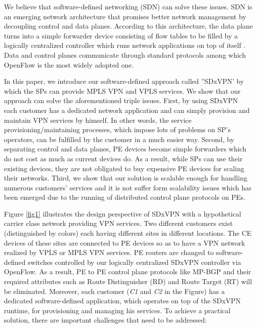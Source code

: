 \documentclass[10pt,conference]{IEEEtran}
\begin{document}
We believe that  software-defined networking (SDN) can solve these issues. SDN is an emerging network architecture that promises better network management by decoupling control and data planes. According to this architecture, the  data plane  turns into  a simple forwarder device consisting of flow tables to be filled by a logically centralized controller   which runs   network applications on top of itself \cite{15}. Data and control planes communicate through standard protocols among which OpenFlow \cite{16} is the most widely adopted one.
 
In this paper, we introduce our  software-defined approach called ''SDxVPN' by which the SPs can provide MPLS VPN and VPLS services. We show that our approach can solve  the aforementioned triple issues. First, by using SDxVPN each customer has a dedicated network application and can simply provision and maintain VPN services by himself. In other words, the service provisioning/maintaining processes, which impose lots of problems on SP's operators, can be fulfilled by the customer in a much easier way.  Second, by separating control and data planes, PE devices become simple forwarders which do not cost as much as current devices do. As a result, while SPs can use their existing devices, they are not obligated to buy expensive PE devices for scaling their networks. Third, we show that our solution is  scalable enough for handling numerous customers' services and it is not suffer form scalability issues which has been emerged due to the running of distributed control plane protocols on PEs. 

Figure \ref {fig1} illustrates the design perspective of  SDxVPN with a hypothetical carrier class network providing VPN services. Two different customers exist (distinguished by colors) each having different sites in different locations. The CE devices of these sites are connected to PE devices so as to have a VPN network realized by VPLS or MPLS VPN services. PE routers are changed to software-defined switches controlled by our logically centralized SDxVPN controller via OpenFlow. As a result,
PE to PE control plane protocols like MP-BGP and their required attributes such as Route Distinguisher (RD) and Route Target (RT) will be eliminated.
Moreover, each customer (\textit{C1} and \textit{C2} in the Figure) has a dedicated software-defined application, which operates on top of the SDxVPN runtime, for provisioning and managing his services. To achieve a practical solution, there are important challenges that need to be addressed:
\end{document}
